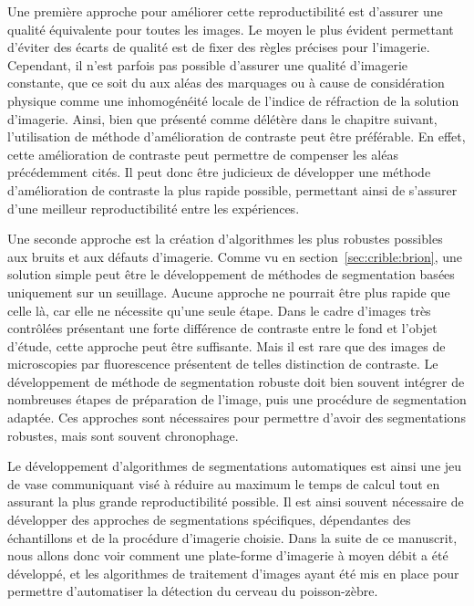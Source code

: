 \documentclass[\main/main.tex]{subfiles}
\begin{document}
%
Une première approche pour améliorer cette reproductibilité est d'assurer une qualité équivalente pour toutes les images.
%
Le moyen le plus évident permettant d'éviter des écarts de qualité est de fixer des règles précises pour l'imagerie.
%
Cependant, il n'est parfois pas possible d'assurer une qualité d'imagerie constante, que ce soit du aux aléas des marquages \ihc{} ou à cause de considération physique comme une inhomogénéité locale de l'indice de réfraction de la solution d'imagerie.
%
Ainsi, bien que présenté comme délétère dans le chapitre suivant, l'utilisation de méthode d'amélioration de contraste peut être préférable.
%
En effet, cette amélioration de contraste peut permettre de compenser les aléas précédemment cités.
%
Il peut donc être judicieux de développer une méthode d'amélioration de contraste la plus rapide possible, permettant ainsi de s'assurer d'une meilleur reproductibilité entre les expériences.

Une seconde approche est la création d'algorithmes les plus robustes possibles aux bruits et aux défauts d'imagerie.
%
Comme vu en section~\ref{sec:crible:brion}, une solution simple peut être le développement de méthodes de segmentation basées uniquement sur un seuillage.
%
Aucune approche ne pourrait être plus rapide que celle là, car elle ne nécessite qu'une seule étape.
%
Dans le cadre d'images très contrôlées présentant une forte différence de contraste entre le fond et l'objet d'étude, cette approche peut être suffisante.
%
Mais il est rare que des images de microscopies par fluorescence présentent de telles distinction de contraste.
%
Le développement de méthode de segmentation robuste doit bien souvent intégrer de nombreuses étapes de préparation de l'image,
puis une procédure de segmentation adaptée.
%
Ces approches sont nécessaires pour permettre d'avoir des segmentations robustes, mais sont souvent chronophage.

%
Le développement d'algorithmes de segmentations automatiques est ainsi une jeu de vase communiquant visé à réduire au maximum le temps de calcul tout en assurant la plus grande reproductibilité possible.
%
Il est ainsi souvent nécessaire de développer des approches de segmentations spécifiques,
dépendantes des échantillons et de la procédure d'imagerie choisie.
%
Dans la suite de ce manuscrit, nous allons donc voir comment une plate-forme d'imagerie à moyen débit a été développé, et les algorithmes de traitement d'images ayant été mis en place pour permettre d'automatiser la détection du cerveau du poisson-zèbre.
\end{document}
